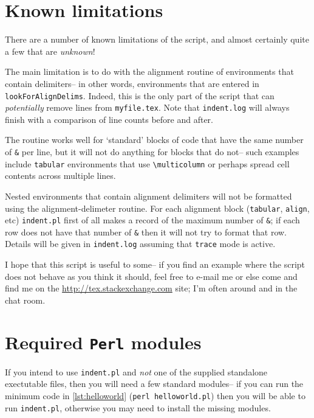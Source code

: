 \section{Known limitations}\label{sec:knownlimitations}
There are a number of known limitations of the script, and almost certainly quite a
few that are \emph{unknown}!
      
The main limitation is to do with the alignment routine of environments that contain 
delimiters-- in other words, environments that are entered in \lstinline!lookForAlignDelims!.
Indeed, this is the only part of the script that can \emph{potentially} remove 
lines from \lstinline!myfile.tex!. Note that \lstinline!indent.log! will always
finish with a comparison of line counts before and after. 
      
The routine works well for `standard' blocks of code that have the same number of \lstinline!&!
per line, but it will not do anything for blocks that do not-- such examples 
include \lstinline!tabular! environments that use \lstinline!\multicolumn! or 
perhaps spread cell contents across multiple lines.
      
Nested environments that contain alignment delimiters will not be formatted
using the alignment-delimeter routine. For each alignment block (\lstinline!tabular!, 
\lstinline!align!, etc) \lstinline!indent.pl! first of all makes a record 
of the maximum number of \lstinline!&!; if each row does not have that 
number of \lstinline!&! then it will not try to format that row. Details 
will be given in \lstinline!indent.log! assuming that \lstinline!trace! mode
is active.
      
I hope that this script is useful to some-- if you find an example where the 
script does not behave as you think it should, feel free to e-mail me or else
come and find me on the \url{http://tex.stackexchange.com} site; I'm often around 
and in the chat room.
      
\printbibliography[heading=bibintoc]

\appendix
\section{Required \lstinline!Perl! modules}\label{sec:requiredmodules}
If you intend to use \lstinline!indent.pl! and \emph{not} one of the supplied standalone exectutable files, then you will need a few standard modules-- if you can run the 
minimum code in \cref{lst:helloworld} (\lstinline!perl helloworld.pl!) then you will be able to run \lstinline!indent.pl!, otherwise you may 
need to install the missing modules.
 	 	 	 	 	
